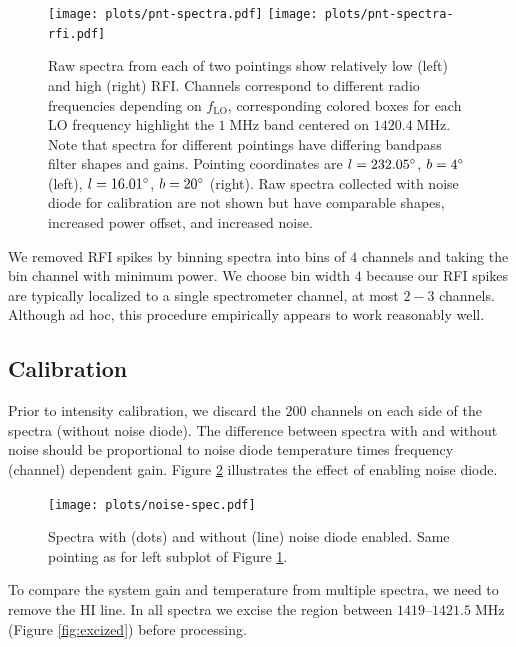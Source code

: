 \documentclass[10pt]{article}
\newcommand {\mt}{\mathrm}
\newcommand {\unit}[1]{\; \mt{#1}}
\begin{document}
\begin{figure}[!ht]
    \centering
    \texttt{[image: plots/pnt-spectra.pdf]}
    \texttt{[image: plots/pnt-spectra-rfi.pdf]} \\
    \caption{Raw spectra from each of two pointings show relatively low (left) and high (right) RFI.  Channels correspond to different radio frequencies depending on $f_{\mt{LO}}$, corresponding colored boxes for each LO frequency highlight the $1\unit{MHz}$ band centered on $1420.4 \unit{MHz}$.  Note that spectra for different pointings have differing bandpass filter shapes and gains.  Pointing coordinates are $l=232.05\degree$, $b=4\degree$ (left), $l=16.01\degree$, $b=20\degree$ (right).  Raw spectra collected with noise diode for calibration are not shown but have comparable shapes, increased power offset, and increased noise.}
    \label{fig:rfi}
\end{figure}

We removed RFI spikes by binning spectra into bins of $4$ channels and taking the bin channel with minimum power.  We choose bin width $4$ because our RFI spikes are typically localized to a single spectrometer channel, at most $2-3$ channels.  Although ad hoc, this procedure empirically appears to work reasonably well.

\subsection{Calibration}

Prior to intensity calibration, we discard the $200$ channels on each side of the spectra (without noise diode).  The difference between spectra with and without noise should be proportional to noise diode temperature times frequency (channel) dependent gain.  Figure \ref{fig:noise} illustrates the effect of enabling noise diode.

\begin{figure}[!ht]
    \centering
    \texttt{[image: plots/noise-spec.pdf]}\\
    \caption{Spectra with (dots) and without (line) noise diode enabled.  Same pointing as for left subplot of Figure \ref{fig:rfi}.}
    \label{fig:noise}
\end{figure}

To compare the system gain and temperature from multiple spectra, we need to remove the HI line.  In all spectra we excise the region between $1419$--$1421.5\unit{MHz}$ (Figure \ref{fig:excized}) before processing.
\end{document}
